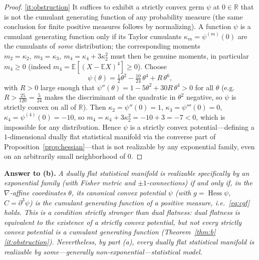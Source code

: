 \documentclass{amsart}
\theoremstyle{definition}
\theoremstyle{remark}
\begin{document}
\begin{proof}
\eqref{it:obstruction} It suffices to exhibit a strictly convex germ $\psi$ at
$0\in\mathbb R$ that is not the cumulant generating function of any probability
measure (the same conclusion for finite positive measures follows by
normalizing). A function $\psi$ is a cumulant generating function only if its
Taylor cumulants $\kappa_{m}=\psi^{(m)}(0)$ are the cumulants of \emph{some}
distribution; the corresponding moments
$m_{2}=\kappa_{2},\ m_{3}=\kappa_{3},\ m_{4}=\kappa_{4}+3\kappa_{2}^{2}$
must then be genuine moments, in particular $m_{4}\ge0$ (indeed
$m_{4}=\mathbb E[(X-\mathbb E X)^{4}]\ge0$). Choose
\[
  \psi(\theta)=\tfrac12\theta^{2}-\tfrac{10}{24}\,\theta^{4}+R\,\theta^{6},
\]
with $R>0$ large enough that $\psi''(\theta)=1-5\theta^{2}+30R\,\theta^{4}>0$ for
all $\theta$ (e.g.\ $R>\tfrac{25}{120}=\tfrac{5}{24}$ makes the discriminant of
the quadratic in $\theta^{2}$ negative, so $\psi$ is strictly convex on all of
$\mathbb R$). Then $\kappa_{2}=\psi''(0)=1$, $\kappa_{3}=\psi'''(0)=0$,
$\kappa_{4}=\psi^{(4)}(0)=-10$, so
$m_{4}=\kappa_{4}+3\kappa_{2}^{2}=-10+3=-7<0$, which is impossible for any
distribution. Hence $\psi$ is a strictly convex potential---defining a
$1$-dimensional dually flat statistical manifold via the converse part of
Proposition~\ref{prop:hessian}---that is not realizable by any exponential
family, even on an arbitrarily small neighborhood of $0$.
\end{proof}

\medskip
\noindent\textbf{Answer to (b).}
\emph{A dually flat statistical manifold is realizable specifically by an
exponential family (with Fisher metric and $\pm1$-connections) if and only if,
in the $\nabla$-affine coordinates $\theta$, its canonical convex potential
$\psi$ (with $g=\operatorname{Hess}\psi$, $C=\partial^{3}\psi$) is the cumulant
generating function of a positive measure, i.e.\ \eqref{eq:cgf} holds. This is a
condition strictly stronger than dual flatness: dual flatness is equivalent to the
existence of a strictly convex potential, but not every strictly convex potential
is a cumulant generating function (Theorem~\ref{thm:b}\eqref{it:obstruction}).
Nevertheless, by part (a), every dually flat statistical manifold is realizable by
some---generally non-exponential---statistical model.}
\end{document}

